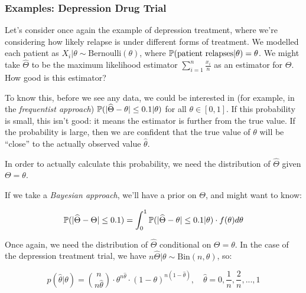 \documentclass[a4paper]{article}
\begin{document}
            \subsubsection{Examples: Depression Drug Trial}

            Let's consider once again the example of depression treatment, where
            we're considering how likely relapse is under different forms of
            treatment. We modelled each patient as $X_i|\theta \sim
            \text{Bernoulli}(\theta)$, where $\mathbb{P}(\text{patient relapses} |
            \theta) = \theta$. We might take $\widehat \Theta$ to be the maximum
            likelihood estimator $\sum\limits_{i=1}^n \frac{x_i}{n}$ as an
            estimator for $\Theta$. How good is this estimator?

            To know this, before we see any data, we could be interested in (for
            example, in the \textit{frequentist approach}) $\mathbb{P}(|\widehat
            \Theta - \theta| \leq 0.1 | \theta)$ for all $\theta \in [0, 1]$. If
            this probability is small, this isn't good: it means the estimator
            is further from the true value. If the probability is large, then we
            are confident that the true value of $\theta$ will be ``close'' to
            the actually observed value $\widehat \theta$.

            In order to actually calculate this probability, we need the
            distribution of $\widehat \Theta$ given $\Theta = \theta$.

            If we take a \textit{Bayesian approach}, we'll have a prior on
            $\Theta$, and might want to know:

            \[
                \mathbb{P}(|\widehat \Theta - \Theta| \leq 0.1) = \int_0^1 \mathbb{P}(|
                \widehat \Theta - \theta| \leq 0.1 | \theta) \cdot f(\theta)
                d\theta
            \]

            Once again, we need the distribution of $\widehat \Theta$
            conditional on $\Theta = \theta$. In the case of the depression
            treatment trial, we have $n\widehat \Theta | \theta \sim
            \text{Bin}(n, \theta)$, so:

            \[
                p(\widehat \theta | \theta) = {n \choose {n\widehat \theta}}
                \cdot \theta^{n\widehat \theta} \cdot (1 - \theta)^{n(1 -
                \widehat \theta)}, \quad \widehat \theta = 0, \frac{1}{n},
                \frac{2}{n}, ..., 1
            \]
\end{document}
